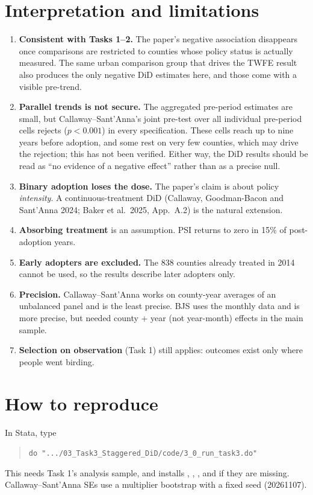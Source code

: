 \documentclass[11pt]{article}
\begin{document}
\section{Interpretation and limitations}
\begin{enumerate}
\item \textbf{Consistent with Tasks 1--2.} The paper's negative association disappears once comparisons are restricted to counties whose policy status is actually measured. The same urban comparison group that drives the TWFE result also produces the only negative DiD estimates here, and those come with a visible pre-trend.
\item \textbf{Parallel trends is not secure.} The aggregated pre-period estimates are small, but Callaway--Sant'Anna's joint pre-test over all individual pre-period cells rejects ($p<0.001$) in every specification. These cells reach up to nine years before adoption, and some rest on very few counties, which may drive the rejection; this has not been verified. Either way, the DiD results should be read as ``no evidence of a negative effect'' rather than as a precise null.
\item \textbf{Binary adoption loses the dose.} The paper's claim is about policy \emph{intensity}. A continuous-treatment DiD (Callaway, Goodman-Bacon and Sant'Anna 2024; Baker et al.\ 2025, App.\ A.2) is the natural extension.
\item \textbf{Absorbing treatment} is an assumption. PSI returns to zero in 15\% of post-adoption years.
\item \textbf{Early adopters are excluded.} The 838 counties already treated in 2014 cannot be used, so the results describe later adopters only.
\item \textbf{Precision.} Callaway--Sant'Anna works on county-year averages of an unbalanced panel and is the least precise. BJS uses the monthly data and is more precise, but needed county + year (not year-month) effects in the main sample.
\item \textbf{Selection on observation} (Task 1) still applies: outcomes exist only where people went birding.
\end{enumerate}

\section{How to reproduce}
In Stata, type
\begin{quote}\small\texttt{do ".../03\_Task3\_Staggered\_DiD/code/3\_0\_run\_task3.do"}\end{quote} This needs Task 1's analysis sample, and installs , , ,  and  if they are missing. Callaway--Sant'Anna SEs use a multiplier bootstrap with a fixed seed (20261107).
\end{document}
